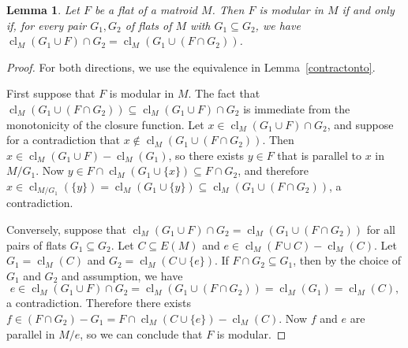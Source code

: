 \documentclass{amsart}
\theoremstyle{plain}
\newtheorem{lemma}[theorem]{Lemma}
\theoremstyle{definition}
\DeclareMathOperator{\cl}{cl}
\newcommand{\con}{/}
\renewcommand{\ss}{\subseteq}
\begin{document}
\begin{lemma}\label{modulardistrib1}
  Let $F$ be a flat of a matroid $M$. Then $F$ is modular in $M$ if and only if, for every pair $G_1,G_2$
  of flats of $M$ with $G_1 \ss G_2$, we have $\cl_M(G_1 \cup F) \cap G_2 = \cl_M(G_1 \cup (F \cap G_2))$. 
\end{lemma}
\begin{proof}
  For both directions, we use the equivalence in Lemma~\ref{contractonto}. 

  First suppose that $F$ is modular in $M$. The fact that $\cl_M(G_1 \cup (F \cap G_2)) \ss \cl_M(G_1 \cup F) \cap G_2$ 
  is immediate from the monotonicity of the closure function.  
  Let $x \in \cl_M(G_1 \cup F) \cap G_2$, and suppose for a contradiction that $x \notin \cl_M(G_1 \cup (F \cap G_2))$. 
  Then $x \in \cl_M(G_1 \cup F) - \cl_M(G_1)$, so there exists $y \in F$
  that is parallel to $x$ in $M \con G_1$. Now $y \in F \cap \cl_M(G_1 \cup \{x\}) \ss F \cap G_2$, 
  and therefore $x \in \cl_{M \con G_1}(\{y\}) = \cl_M(G_1 \cup \{y\}) \ss \cl_M(G_1 \cup (F \cap G_2))$, 
  a contradiction. 

  Conversely, suppose that $\cl_M(G_1 \cup F) \cap G_2 = \cl_M(G_1 \cup (F \cap G_2))$ for all pairs of flats $G_1 \ss G_2$. 
  Let $C \ss E(M)$ and $e \in \cl_M(F \cup C) - \cl_M(C)$. 
  Let $G_1 = \cl_M(C)$ and $G_2 = \cl_M(C \cup \{e\})$. 
  If $F \cap G_2 \ss G_1$, then by the choice of $G_1$ and $G_2$ and assumption, we have
  \[e \in \cl_M(G_1 \cup F) \cap G_2 = \cl_M(G_1 \cup (F \cap G_2)) = \cl_M(G_1) = \cl_M(C),\]
  a contradiction. Therefore there exists $f \in (F \cap G_2) - G_1 = F \cap \cl_M(C \cup \{e\}) - \cl_M(C)$. 
  Now $f$ and $e$ are parallel in $M \con e$, so we can conclude that $F$ is modular. 
\end{proof}
\end{document}
